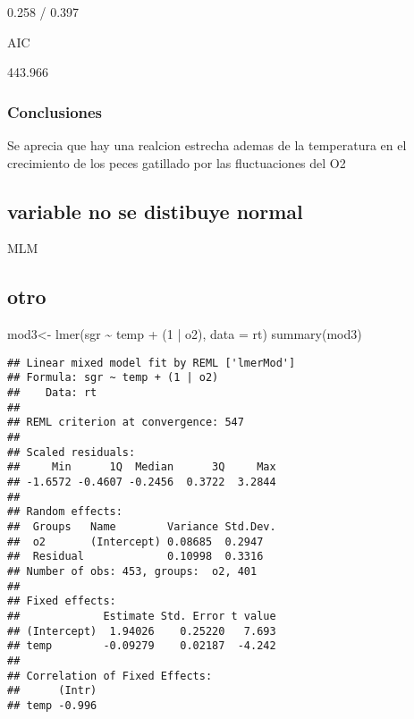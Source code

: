 \documentclass[
]{article}
\newenvironment{Shaded}{\begin{snugshade}}{\end{snugshade}}
\newcommand{\AttributeTok}[1]{\textcolor[rgb]{0.77,0.63,0.00}{#1}}
\newcommand{\DecValTok}[1]{\textcolor[rgb]{0.00,0.00,0.81}{#1}}
\newcommand{\FunctionTok}[1]{\textcolor[rgb]{0.00,0.00,0.00}{#1}}
\newcommand{\NormalTok}[1]{#1}
\newcommand{\OtherTok}[1]{\textcolor[rgb]{0.56,0.35,0.01}{#1}}
\newcommand{\SpecialCharTok}[1]{\textcolor[rgb]{0.00,0.00,0.00}{#1}}
\begin{document}
0.258 / 0.397

AIC

443.966

\hypertarget{conclusiones}{%
\subsubsection{Conclusiones}\label{conclusiones}}

Se aprecia que hay una realcion estrecha ademas de la temperatura en el
crecimiento de los peces gatillado por las fluctuaciones del O2

\hypertarget{variable-no-se-distibuye-normal}{%
\subsection{variable no se distibuye
normal}\label{variable-no-se-distibuye-normal}}

MLM

\hypertarget{otro}{%
\subsection{otro}\label{otro}}

\begin{Shaded}
\begin{Highlighting}[]
\NormalTok{mod3}\OtherTok{\textless{}{-}} \FunctionTok{lmer}\NormalTok{(sgr }\SpecialCharTok{\textasciitilde{}}\NormalTok{ temp }\SpecialCharTok{+}\NormalTok{ (}\DecValTok{1} \SpecialCharTok{|}\NormalTok{ o2), }\AttributeTok{data =}\NormalTok{ rt)}
\FunctionTok{summary}\NormalTok{(mod3)}
\end{Highlighting}
\end{Shaded}

\begin{verbatim}
## Linear mixed model fit by REML ['lmerMod']
## Formula: sgr ~ temp + (1 | o2)
##    Data: rt
## 
## REML criterion at convergence: 547
## 
## Scaled residuals: 
##     Min      1Q  Median      3Q     Max 
## -1.6572 -0.4607 -0.2456  0.3722  3.2844 
## 
## Random effects:
##  Groups   Name        Variance Std.Dev.
##  o2       (Intercept) 0.08685  0.2947  
##  Residual             0.10998  0.3316  
## Number of obs: 453, groups:  o2, 401
## 
## Fixed effects:
##             Estimate Std. Error t value
## (Intercept)  1.94026    0.25220   7.693
## temp        -0.09279    0.02187  -4.242
## 
## Correlation of Fixed Effects:
##      (Intr)
## temp -0.996
\end{verbatim}
\end{document}

